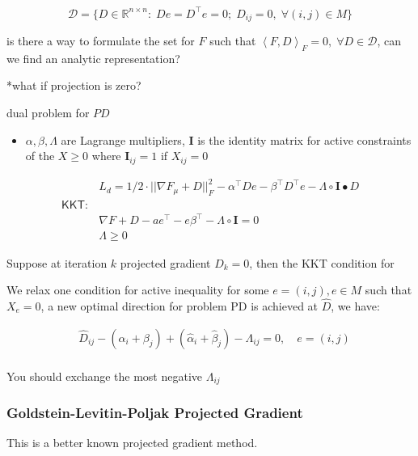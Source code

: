 \documentclass[
  10pt,
  a4paper,
,tablecaptionabove
]{scrartcl}
\providecommand{\tightlist}{%
  \setlength{\itemsep}{0pt}\setlength{\parskip}{0pt}}
\renewenvironment{quote}{\begin{customblockquote}\list{}{\rightmargin=0em\leftmargin=0em}%
\item\relax\color{blockquote-text}\ignorespaces}{\unskip\unskip\endlist\end{customblockquote}}
\begin{document}
\[\mathcal D = \{D\in\mathbb{R}^{n\times n} : \; D e = D^\top e = 0;\; D_{ij} = 0,\;\forall  (i,j) \in M \}\]

is there a way to formulate the set for \(F\) such that
\(\left <F, D \right>_F = 0, \; \forall D\in \mathcal D\), can we find
an analytic representation?

\begin{quote}
*what if projection is zero?
\end{quote}

dual problem for \(PD\)

\begin{itemize}
\tightlist
\item
  \(\alpha,\beta,\Lambda\) are Lagrange multipliers, \(\mathbf I\) is
  the identity matrix for active constraints of the \(X \ge 0\) where
  \(\mathbf I_{ij} = 1\) if \(X_{ij} = 0\)
\end{itemize}

\[\begin{aligned}
& L_d = 1/2\cdot ||\nabla F_\mu + D ||_F^2 - \alpha^\top De - \beta^\top D^\top e -\Lambda \circ \mathbf I \bullet D\\
\mathsf{KKT:} & \\
& \nabla F+D - ae^\top - e\beta^\top -\Lambda \circ \mathbf{I} = 0 \\
& \Lambda \ge 0
\end{aligned}\]

Suppose at iteration \(k\) projected gradient \(D_k = 0\), then the KKT
condition for

We relax one condition for active inequality for some
\(e = (i,j), e \in M\) such that \(X_e =0\), a new optimal direction for
problem PD is achieved at \(\hat D\), we have:

\[\begin{aligned}
 & \hat D_{ij} - (\alpha_i + \beta_j) + (\hat \alpha_i + \hat \beta_j) - \Lambda_{ij} = 0, \quad e = (i,j) \\
\end{aligned}\]

You should exchange the most negative \(\Lambda_{ij}\)

\hypertarget{goldstein-levitin-poljak-projected-gradient}{%
\subsubsection{Goldstein-Levitin-Poljak Projected
Gradient}\label{goldstein-levitin-poljak-projected-gradient}}

This is a better known projected gradient method.
\end{document}
